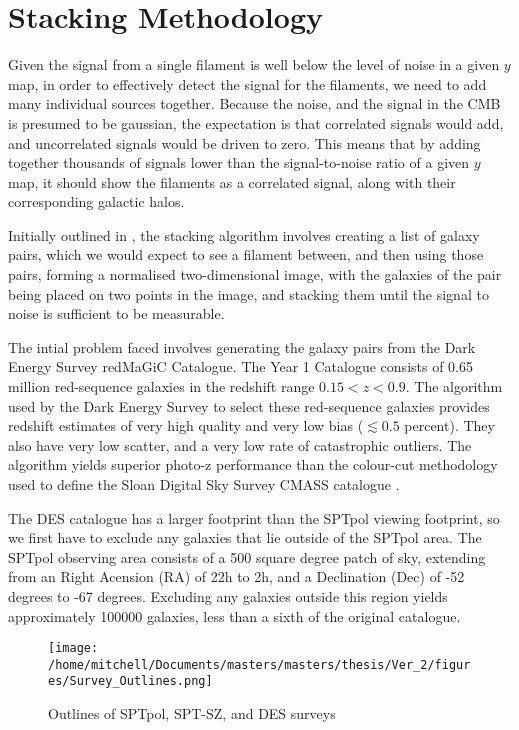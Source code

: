 
\chapter{Stacking Methodology}
Given the signal from a single filament is well below the level of noise in a given $y$ map, in order to effectively detect the signal for the filaments, we need to add many individual sources together. Because the noise, and the signal in the CMB is presumed to be gaussian, the expectation is that correlated signals would add, and uncorrelated signals would be driven to zero. This means that by adding together thousands of signals lower than the signal-to-noise ratio of a given $y$ map, it should show the filaments as a correlated signal, along with their corresponding galactic halos.

Initially outlined in \cite{2016MNRAS.457.2391C}, the stacking algorithm involves creating a list of galaxy pairs, which we would expect to see a filament between, and then using those pairs, forming a normalised two-dimensional image, with the galaxies of the pair being placed on two points in the image, and stacking them until the signal to noise is sufficient to be measurable.

The intial problem faced involves generating the galaxy pairs from the Dark Energy Survey redMaGiC Catalogue. The Year 1 Catalogue consists of 0.65 million red-sequence galaxies in the redshift range $0.15 < z < 0.9 $. The algorithm used by the Dark Energy Survey to select these red-sequence galaxies provides redshift estimates of very high quality and very low bias ($\lesssim 0.5$ percent). They also have very low scatter, and a very low rate of catastrophic outliers. The algorithm yields superior photo-z performance than the colour-cut methodology used to define the Sloan Digital Sky Survey CMASS catalogue \citep{2016MNRAS.461.1431R}. 

The DES catalogue has a larger footprint than the SPTpol viewing footprint, so we first have to exclude any galaxies that lie outside of the SPTpol area. The SPTpol observing area consists of a 500 square degree patch of sky, extending from an Right Acension (RA) of 22h to 2h, and a Declination (Dec) of -52 degrees to -67 degrees. Excluding any galaxies outside this region yields approximately 100000 galaxies, less than a sixth of the original catalogue. 

\begin{figure}[h!]
\centering 
\texttt{[image: /home/mitchell/Documents/masters/masters/thesis/Ver\_2/figures/Survey\_Outlines.png]}
\caption{Outlines of SPTpol, SPT-SZ, and DES surveys}
\label{fig:surveys}
\end{figure}



